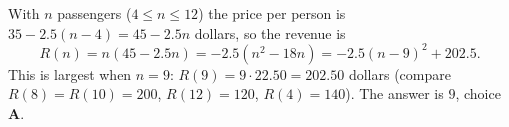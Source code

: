 With $n$ passengers ($4\le n\le12$) the price per person is $35-2.5(n-4)=45-2.5n$ dollars, so the revenue is
\[
R(n)=n(45-2.5n)=-2.5\left(n^2-18n\right)=-2.5(n-9)^2+202.5 .
\]
This is largest when $n=9$: $R(9)=9\cdot22.50=202.50$ dollars (compare $R(8)=R(10)=200$, $R(12)=120$, $R(4)=140$). The answer is $\boxed{9}$, choice $\textbf{A}$.
